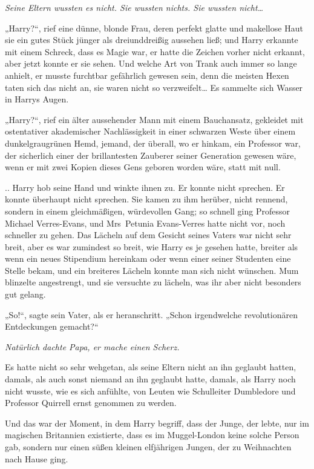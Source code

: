 {\emph{Seine Eltern wussten es nicht. Sie wussten nichts. Sie wussten nicht…}

„Harry?“, rief eine dünne, blonde Frau, deren perfekt glatte und makellose Haut sie ein gutes Stück jünger als dreiunddreißig aussehen ließ; und Harry erkannte mit einem Schreck, dass es Magie war, er hatte die Zeichen vorher nicht erkannt, aber jetzt konnte er sie sehen. Und welche Art von Trank auch immer so lange anhielt, er musste furchtbar gefährlich gewesen sein, denn die meisten Hexen taten sich das nicht an, sie waren nicht so verzweifelt… Es sammelte sich Wasser in Harrys Augen.

„Harry?“, rief ein älter aussehender Mann mit einem Bauchansatz, gekleidet mit ostentativer akademischer Nachlässigkeit in einer schwarzen Weste über einem dunkelgraugrünen Hemd, jemand, der überall, wo er hinkam, ein Professor war, der sicherlich einer der brillantesten Zauberer seiner Generation gewesen wäre, wenn er mit zwei Kopien dieses Gens geboren worden wäre, statt mit null.

.. Harry hob seine Hand und winkte ihnen zu. Er konnte nicht sprechen. Er konnte überhaupt nicht sprechen. Sie kamen zu ihm herüber, nicht rennend, sondern in einem gleichmäßigen, würdevollen Gang; so schnell ging Professor Michael Verres-Evans, und Mrs~Petunia Evans-Verres hatte nicht vor, noch schneller zu gehen. Das Lächeln auf dem Gesicht seines Vaters war nicht sehr breit, aber es war zumindest so breit, wie Harry es je gesehen hatte, breiter als wenn ein neues Stipendium hereinkam oder wenn einer seiner Studenten eine Stelle bekam, und ein breiteres Lächeln konnte man sich nicht wünschen. Mum blinzelte angestrengt, und sie versuchte zu lächeln, was ihr aber nicht besonders gut gelang.

„So!“, sagte sein Vater, als er heranschritt. „Schon irgendwelche revolutionären Entdeckungen gemacht?“

\emph{Natürlich dachte Papa, er mache einen Scherz.}

Es hatte nicht so sehr wehgetan, als seine Eltern nicht an ihn geglaubt hatten, damals, als auch sonst niemand an ihn geglaubt hatte, damals, als Harry noch nicht wusste, wie es sich anfühlte, von Leuten wie Schulleiter Dumbledore und Professor Quirrell ernst genommen zu werden.

Und das war der Moment, in dem Harry begriff, dass der Junge, der lebte, nur im magischen Britannien existierte, dass es im Muggel-London keine solche Person gab, sondern nur einen süßen kleinen elfjährigen Jungen, der zu Weihnachten nach Hause ging.

}
